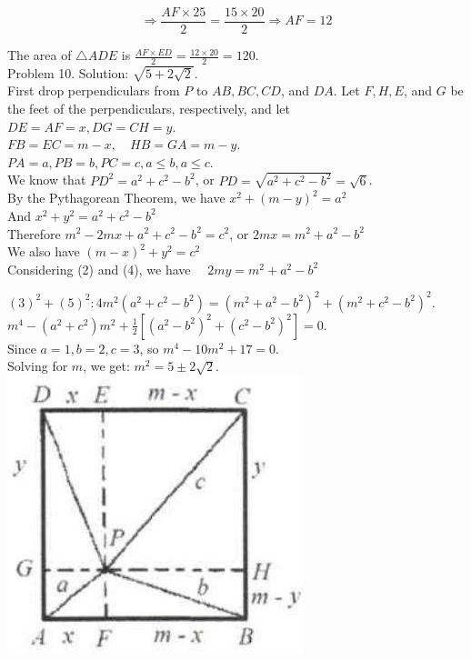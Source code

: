 \documentclass[10pt]{article}
\begin{document}
\[
\Rightarrow \frac{A F \times 25}{2}=\frac{15 \times 20}{2} \Rightarrow A F=12
\]

The area of \(\triangle A D E\) is \(\frac{A F \times E D}{2}=\frac{12 \times 20}{2}=120\).\\
Problem 10. Solution: \(\sqrt{5+2 \sqrt{2}}\).\\
First drop perpendiculars from \(P\) to \(A B, B C, C D\), and \(D A\). Let \(F, H, E\), and \(G\) be the feet of the perpendiculars, respectively, and let\\
\(D E=A F=x, D G=C H=y\).\\
\(F B=E C=m-x, \quad H B=G A=m-y\).\\
\(P A=a, P B=b, P C=c, a \leq b, a \leq c\).\\
We know that \(P D^{2}=a^{2}+c^{2}-b^{2}\), or \(P D=\sqrt{a^{2}+c^{2}-b^{2}}=\sqrt{6}\).\\
By the Pythagorean Theorem, we have \(x^{2}+(m-y)^{2}=a^{2}\)\\
And \(x^{2}+y^{2}=a^{2}+c^{2}-b^{2}\)\\
Therefore \(m^{2}-2 m x+a^{2}+c^{2}-b^{2}=c^{2}\), or \(2 m x=m^{2}+a^{2}-b^{2}\)\\
We also have \((m-x)^{2}+y^{2}=c^{2}\)\\
Considering (2) and (4), we have \(\quad 2 m y=m^{2}+a^{2}-b^{2}\)


\((3)^{2}+(5)^{2}: 4 m^{2}\left(a^{2}+c^{2}-b^{2}\right)=\left(m^{2}+a^{2}-b^{2}\right)^{2}+\left(m^{2}+c^{2}-b^{2}\right)^{2}\). \(m^{4}-\left(a^{2}+c^{2}\right) m^{2}+\frac{1}{2}\left[\left(a^{2}-b^{2}\right)^{2}+\left(c^{2}-b^{2}\right)^{2}\right]=0\).\\
Since \(a=1, b=2, c=3\), so \(m^{4}-10 m^{2}+17=0\).\\
Solving for \(m\), we get: \(m^{2}=5 \pm 2 \sqrt{2}\).\\
\includegraphics[max width=\textwidth, center]{2025_04_17_97bc1f7e44d93c271a88g-096}
\end{document}
